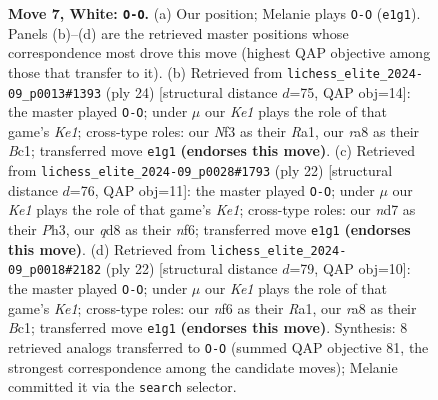\documentclass[11pt]{article}
\begin{document}
\begin{figure}[p]
\caption{\textbf{Move 7, White: \texttt{O-O}.} (a) Our position; Melanie plays \texttt{O-O} (\texttt{e1g1}). Panels (b)--(d) are the retrieved master positions whose correspondence most drove this move (highest QAP objective among those that transfer to it). (b) Retrieved from \texttt{lichess\_elite\_2024-09\_p0013\#1393} (ply 24) [structural distance $d$=75, QAP obj=14]: the master played \texttt{O-O}; under $\mu$ our \emph{Ke1} plays the role of that game's \emph{Ke1}; cross-type roles: our \emph{N}f3 as their \emph{R}a1, our \emph{r}a8 as their \emph{B}c1; transferred move \texttt{e1g1} \textbf{(endorses this move)}. (c) Retrieved from \texttt{lichess\_elite\_2024-09\_p0028\#1793} (ply 22) [structural distance $d$=76, QAP obj=11]: the master played \texttt{O-O}; under $\mu$ our \emph{Ke1} plays the role of that game's \emph{Ke1}; cross-type roles: our \emph{n}d7 as their \emph{P}h3, our \emph{q}d8 as their \emph{n}f6; transferred move \texttt{e1g1} \textbf{(endorses this move)}. (d) Retrieved from \texttt{lichess\_elite\_2024-09\_p0018\#2182} (ply 22) [structural distance $d$=79, QAP obj=10]: the master played \texttt{O-O}; under $\mu$ our \emph{Ke1} plays the role of that game's \emph{Ke1}; cross-type roles: our \emph{n}f6 as their \emph{R}a1, our \emph{r}a8 as their \emph{B}c1; transferred move \texttt{e1g1} \textbf{(endorses this move)}. Synthesis: 8 retrieved analogs transferred to \texttt{O-O} (summed QAP objective 81, the strongest correspondence among the candidate moves); Melanie committed it via the \texttt{search} selector.}
\label{fig:thought-m12}
\end{figure}

\clearpage
\end{document}
